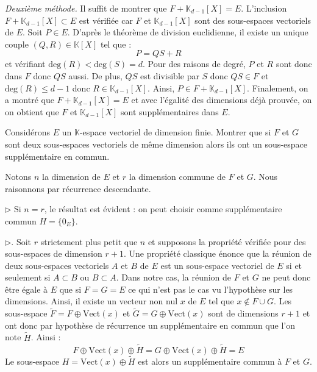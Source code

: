 \documentclass[a4paper,twoside,french,11pt]{VcCours}
\begin{document}
\begin{enumerate}
\textit{Deuxième méthode.}  Il suffit de montrer que $F + \mathbb{K}_{d-1}[X]=E$. L'inclusion  $ F + \mathbb{K}_{d-1}[X] \subset E$ est vérifiée car $F$ et $\mathbb{K}_{d-1}[X]$ sont des sous-espaces vectoriels de $E$. Soit $P \in E$. D'après le théorème de division euclidienne, il existe un unique couple $(Q,R) \in \mathbb{K}[X]$ tel que :
$$ P = QS+R$$
et vérifiant $\textrm{deg}(R) < \textrm{deg}(S) = d$. Pour des raisons de degré, $P$ et $R$ sont donc dans $F$ donc $QS$ aussi. De plus, $QS$ est divisible par $S$ donc $QS \in F$ et $\textrm{deg}(R) \leq d-1$ donc $R \in \mathbb{K}_{d-1}[X]$. Ainsi, $P \in F + \mathbb{K}_{d-1}[X]$. Finalement, on a montré que $F + \mathbb{K}_{d-1}[X]=E$ et avec l'égalité des dimensions déjà prouvée, on on obtient que $F$ et $\mathbb{K}_{d-1}[X]$ sont supplémentaires dans $E$.
\end{enumerate}


\begin{Exercice}{} Considérons $E$ un $\mathbb{K}$-espace vectoriel de dimension finie. Montrer que si $F$ et $G$ sont deux sous-espaces vectoriels de même dimension alors ils ont un sous-espace supplémentaire en commun.
\end{Exercice}

\corr Notons $n$ la dimension de $E$ et $r$ la dimension commune de $F$ et $G$. Nous raisonnons par récurrence descendante.

\medskip

$\rhd$ Si $n=r$, le résultat est évident : on peut choisir comme supplémentaire commun $H = \lbrace 0_E \rbrace$.

\medskip

$\rhd$. Soit $r$ strictement plus petit que $n$ et supposons la propriété vérifiée pour des sous-espaces de dimension $r+1$. Une propriété classique énonce que la réunion de deux sous-espaces vectoriels $A$ et $B$ de $E$ est un sous-espace vectoriel de $E$ si et seulement si $A \subset B$ ou $B \subset A$. Dans notre cas, la réunion de $F$ et $G$ ne peut donc être égale à $E$ que si $F=G=E$ ce qui n'est pas le cas vu l'hypothèse sur les dimensions. Ainsi, il existe un vecteur non nul $x$ de $E$ tel que $x \notin F \cup G$. Les sous-espace $\tilde{F}= F \oplus \textrm{Vect}(x)$ et $\tilde{G}= G \oplus \textrm{Vect}(x)$ sont de dimensions $r+1$ et ont donc par hypothèse de récurrence un supplémentaire en commun que l'on note $\tilde{H}$. Ainsi :
$$  F \oplus \textrm{Vect}(x) \oplus \tilde{H} =  G \oplus \textrm{Vect}(x) \oplus \tilde{H} = E$$
Le sous-espace $H=\textrm{Vect}(x) \oplus \tilde{H}$ est alors un supplémentaire commun à $F$ et $G$.
\end{document}
